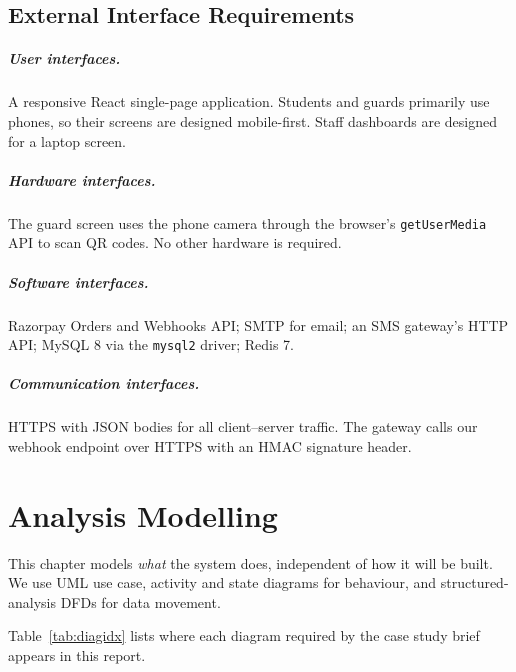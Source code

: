 \documentclass[11pt,a4paper]{report}
\begin{document}
\section{External Interface Requirements}
\paragraph{User interfaces.} A responsive React single-page application. Students and guards primarily use phones, so their screens are designed mobile-first. Staff dashboards are designed for a laptop screen.

\paragraph{Hardware interfaces.} The guard screen uses the phone camera through the browser's \texttt{getUserMedia} API to scan QR codes. No other hardware is required.

\paragraph{Software interfaces.} Razorpay Orders and Webhooks API; SMTP for email; an SMS gateway's HTTP API; MySQL 8 via the \texttt{mysql2} driver; Redis 7.

\paragraph{Communication interfaces.} HTTPS with JSON bodies for all client--server traffic. The gateway calls our webhook endpoint over HTTPS with an HMAC signature header.
\chapter{Analysis Modelling}
This chapter models \emph{what} the system does, independent of how it will be built. We use UML use case, activity and state diagrams for behaviour, and structured-analysis DFDs for data movement.

Table~\ref{tab:diagidx} lists where each diagram required by the case study brief appears in this report.
\end{document}
